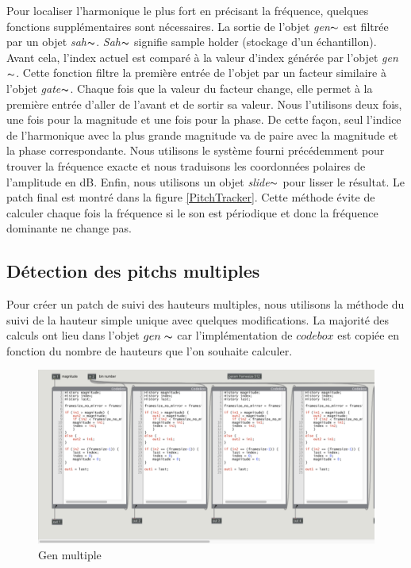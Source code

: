 Pour localiser l’harmonique le plus fort en précisant la fréquence, quelques fonctions supplémentaires sont nécessaires. La sortie de l'objet \textit{gen}$\thicksim $ est filtrée par un objet \textit{sah}$ \thicksim $. \textit{Sah}$\thicksim $ signifie  \guillemotleft sample holder \guillemotright (stockage d'un échantillon). Avant cela, l'index actuel est comparé à la valeur d'index générée par l'objet \textit{gen}$\thicksim $.  Cette fonction filtre la première entrée de l'objet par un facteur similaire à l'objet \textit{gate}$\thicksim $. Chaque fois que la valeur du facteur change, elle permet à la première entrée d'aller de l'avant et de sortir sa valeur. Nous l'utilisons deux fois, une fois pour la magnitude et une fois pour la phase. De cette façon, seul l’indice de l'harmonique avec la plus grande magnitude va de paire avec la magnitude et la phase correspondante. Nous utilisons le système fourni précédemment pour trouver la fréquence exacte et nous traduisons les coordonnées polaires de l'amplitude en dB. Enfin, nous utilisons un objet \textit{slide}$\thicksim $ pour lisser le résultat. Le patch final est montré dans la figure \ref{PitchTracker}. Cette méthode évite de calculer chaque fois la fréquence si le son est périodique et donc la fréquence dominante ne change pas.

\subsection{Détection des pitchs multiples}

Pour créer un patch de suivi des hauteurs multiples, nous utilisons la méthode du suivi de la hauteur simple unique avec quelques modifications. La majorité des calculs ont lieu dans l'objet $ gen \thicksim $ car l'implémentation de $ codebox $ est copiée en fonction du nombre de hauteurs que l'on souhaite calculer.

    \begin{figure}
        \centering
        \includegraphics[width = \textwidth]{Graphs/GenMultiple.png}
        \caption{Gen multiple}
        \label{GenMultiple}
    \end{figure}

